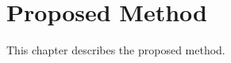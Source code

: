 \chapter{Proposed Method}
\label{chapter:method}

\begin{ChapAbstract}
    This chapter describes the proposed method.
\end{ChapAbstract}



